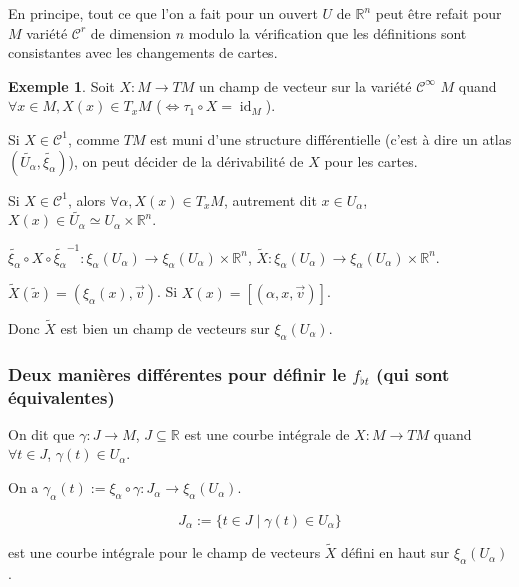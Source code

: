 \documentclass[french]{article}
\theoremstyle{definition}
\newtheorem{protoexemple}{Exemple}[section]
\newenvironment{exemple}
    {\colorlet{shadecolor}{gray!10}\begin{shaded}\begin{protoexemple}}
    {\end{protoexemple}\end{shaded}}
\begin{document}
En principe, tout ce que l'on a fait pour un ouvert \(U\) de \(\mathbb{R}^n\) peut être refait pour \(M\) variété \(\mathcal{C}^r\) de dimension \(n\) modulo la vérification que les définitions sont consistantes avec les changements de cartes.

\begin{exemple}
  Soit \(X : M \longrightarrow TM\) un champ de vecteur sur la variété \(\mathcal{C}^{\infty}\) \(M\) quand \(\forall x \in M, X(x)\in T_x M\) (\(\Leftrightarrow \tau_1 \circ X = \operatorname{id}_M\)).

  Si \(X \in \mathcal{C}^1\), comme \(TM\) est muni d'une structure différentielle (c'est à dire un atlas \((\widetilde{U _{\alpha}}, \widetilde{\xi _{\alpha}})\)), on peut décider de la dérivabilité de \(X\) pour les cartes.

  Si \(X \in \mathcal{C}^1\), alors \(\forall \alpha, X(x) \in T_x M\), autrement dit \(x \in U _{\alpha}\), \(X(x)\in \widetilde{U _{\alpha}} \simeq U _{\alpha}\times \mathbb{R}^n\).

  \(\widetilde{\xi_\alpha} \circ X \circ \widetilde{\xi _{\alpha}}^{-1} : \xi _{\alpha}(U _{\alpha}) \longrightarrow \xi _{\alpha}(U _{\alpha}) \times \mathbb{R}^n\), \(\widetilde{X} : \xi _{\alpha}(U _{\alpha}) \longrightarrow \xi _{\alpha}(U _{\alpha}) \times \mathbb{R}^n\).

  \(\widetilde{X}(\widetilde{x}) = (\xi_\alpha(x), \overrightarrow{v})\). Si \(X(x) = [(\alpha, x,\overrightarrow{v})]\).

  Donc \(\widetilde{X}\) est bien un champ de vecteurs sur \(\xi _{\alpha}(U _{\alpha})\).
\end{exemple}

\subsubsection{Deux manières différentes pour définir le \(f _{\flat t}\) (qui sont équivalentes)}

On dit que \(\gamma : J \longrightarrow M\), \(J \subseteq \mathbb{R}\) est une courbe intégrale de \(X : M \longrightarrow TM\) quand \(\forall t \in J\), \(\gamma(t) \in U _{\alpha}\).

On a \(\gamma _{\alpha}(t) := \xi _{\alpha}\circ \gamma : J _{\alpha} \longrightarrow \xi _{\alpha}(U _{\alpha})\).

\[J _{\alpha}:= \{ t \in J \mid \gamma(t)\in U _{\alpha} \}\]

est une courbe intégrale pour le champ de vecteurs \(\widetilde{X}\) défini en haut sur \(\xi _{\alpha}(U _{\alpha})\).
\end{document}
